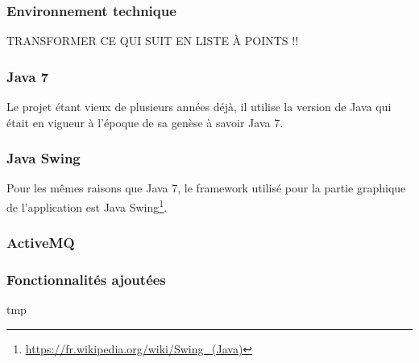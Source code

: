 \subsubsection{Environnement technique}
TRANSFORMER CE QUI SUIT EN LISTE À POINTS !!
\subsubsection{Java 7}
Le projet étant vieux de plusieurs années déjà, il utilise la version de Java qui était en vigueur à l'époque de sa genèse à savoir Java 7.

\subsubsection{Java Swing}
Pour les mêmes raisons que Java 7, le framework utilisé pour la partie graphique de l'application est Java Swing\footnote{\url{https://fr.wikipedia.org/wiki/Swing_(Java)}}.

\subsubsection{ActiveMQ}

\subsubsection{Fonctionnalités ajoutées}
\label{subsec:ajout}
tmp

